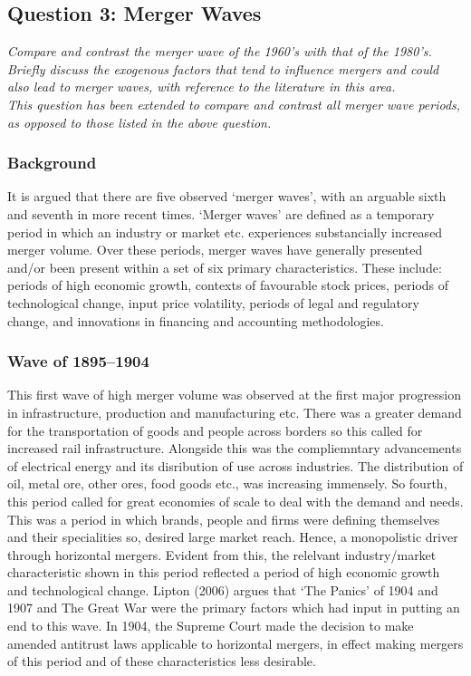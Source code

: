\documentclass[11pt, english]{article}
\begin{document}
	\newpage

	\subsection{Question 3: Merger Waves}

	\textit{Compare and contrast the merger wave of the 1960’s with that of the 1980’s. Briefly discuss the exogenous factors that tend to influence mergers and could also lead to merger waves, with reference to the literature in this area.}\\

	\textit{This question has been extended to compare and contrast all merger wave periods, as opposed to those listed in the above question.}

                \subsubsection*{Background}

        It is argued that there are five observed `merger waves', with an arguable sixth and seventh in more recent times. `Merger waves' are defined as a temporary period in which an industry or market etc. experiences substancially increased merger volume. Over these periods, merger waves have generally presented and/or been present within a set of six primary characteristics. These include: periods of high economic growth, contexts of favourable stock prices, periods of technological change, input price volatility, periods of legal and regulatory change, and innovations in financing and accounting methodologies.

                \subsubsection*{Wave of 1895--1904}

        This first wave of high merger volume was observed at the first major progression in infrastructure, production and manufacturing etc. There was a greater demand for the transportation of goods and people across borders so this called for increased rail infrastructure. Alongside this was the compliemntary advancements of electrical energy and its disribution of use across industries. The distribution of oil, metal ore, other ores, food goods etc., was increasing immensely. So fourth, this period called for great economies of scale to deal with the demand and needs. This was a period in which brands, people and firms were defining themselves and their specialities so, desired large market reach. Hence, a monopolistic driver through horizontal mergers. Evident from this, the relelvant industry/market characteristic shown in this period reflected a period of high economic growth and technological change. Lipton (2006) argues that `The Panics' of 1904 and 1907 and The Great War were the primary factors which had input in putting an end to this wave. In 1904, the Supreme Court made the decision to make amended antitrust laws applicable to horizontal mergers, in effect making mergers of this period and of these characteristics less desirable.
\end{document}
